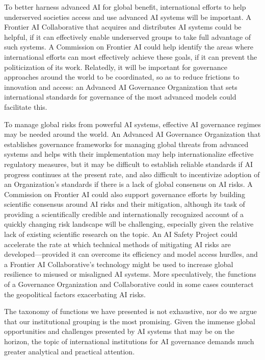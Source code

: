\documentclass[12pt]{article}
\begin{document}
To better harness advanced AI for global benefit, international efforts
to help underserved societies access and use advanced AI systems will be
important. A Frontier AI Collaborative that acquires and distributes AI
systems could be helpful, if it can effectively enable underserved
groups to take full advantage of such systems. A Commission on Frontier
AI could help identify the areas where international efforts can most
effectively achieve these goals, if it can prevent the politicization of
its work. Relatedly, it will be important for governance approaches
around the world to be coordinated, so as to reduce frictions to
innovation and access: an Advanced AI Governance Organization that sets
international standards for governance of the most advanced models could facilitate this.

To manage global risks from powerful AI systems, effective AI governance
regimes may be needed around the world. An Advanced AI Governance
Organization that establishes governance frameworks for managing global
threats from advanced systems and helps with their implementation may
help internationalize effective regulatory measures, but it may be
difficult to establish reliable standards if AI progress continues at
the present rate, and also difficult to incentivize adoption of an
Organization's standards if there is a lack of global consensus on AI
risks. A Commission on Frontier AI could also support governance efforts
by building scientific consensus around AI risks and their mitigation,
although its task of providing a scientifically credible and
internationally recognized account of a quickly changing risk landscape
will be challenging, especially given the relative lack of existing
scientific research on the topic. An AI Safety Project could accelerate
the rate at which technical methods of mitigating AI risks are
developed---provided it can overcome its efficiency and model access
hurdles, and a Frontier AI Collaborative's technology might be used to
increase global resilience to misused or misaligned AI systems. More
speculatively, the functions of a Governance Organization and
Collaborative could in some cases counteract the geopolitical factors
exacerbating AI risks.

The taxonomy of functions we have presented is not exhaustive, nor do we
argue that our institutional grouping is the most promising. Given the
immense global opportunities and challenges presented by AI systems that
may be on the horizon, the topic of international institutions for AI
governance demands much greater analytical and practical attention.
\end{document}
